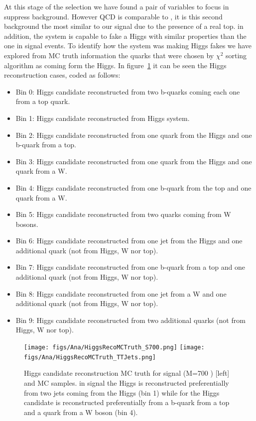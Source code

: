 At this stage of the selection we have found a pair of variables to focus in suppress \ttbar background. However QCD is comparable to \ttbar, it is this second background the most similar to our signal due to the presence of a real top. in addition, the \ttbar system is capable to fake a Higgs with similar properties than the one in signal events. To identify how the \ttbar system was making Higgs fakes we have explored from MC truth information the quarks that were chosen by $\chi^{2}$ sorting algorithm as coming form the Higgs. In figure~\ref{fig:RecohiggsMCTruth} it can be seen the Higgs reconstruction cases, coded as follows:

\begin{itemize}
\item Bin 0: Higgs candidate reconstructed from two b-quarks coming each one from a top quark.
\item Bin 1: Higgs candidate reconstructed from Higgs \bbbar system.
\item Bin 2: Higgs candidate reconstructed from one quark from the Higgs and one b-quark from a top.
\item Bin 3: Higgs candidate reconstructed from one quark from the Higgs and one quark from a W.
\item Bin 4: Higgs candidate reconstructed from one b-quark from the top and one quark from a W.
\item Bin 5: Higgs candidate reconstructed from two quarks coming from W bosons.
\item Bin 6: Higgs candidate reconstructed from one jet from the Higgs and one additional quark (not from Higgs, W nor top).
\item Bin 7: Higgs candidate reconstructed from one b-quark from a top and one additional quark (not from Higgs, W nor top).
\item Bin 8: Higgs candidate reconstructed from one jet from a W and one additional quark (not from Higgs, W nor top).
\item Bin 9: Higgs candidate reconstructed from two additional quarks (not from Higgs, W nor top).
\end{itemize}

\begin{figure}[!Hhtbp]
  \begin{center}
    \texttt{[image: figs/Ana/HiggsRecoMCTruth\_S700.png]}
    \texttt{[image: figs/Ana/HiggsRecoMCTruth\_TTJets.png]}
    \caption{Higgs candidate reconstruction MC truth for signal (M=700 \GeVcc) [left] and \ttbar [right] MC samples. in signal the Higgs is reconstructed preferentially from two jets coming from the Higgs (bin 1) while for \ttbar the Higgs candidate is reconstructed preferentially from a b-quark from a top and a quark from a W boson (bin 4).}
    \label{fig:RecohiggsMCTruth}
  \end{center}
\end{figure}

